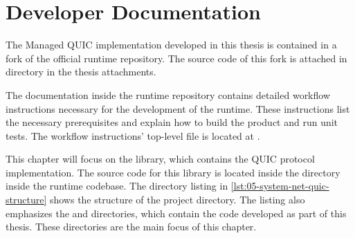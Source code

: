 \chapter{Developer Documentation}

The Managed QUIC implementation developed in this thesis is contained in a fork of the official
\dotnet{} runtime repository. The source code of this fork is attached in
 directory in the thesis attachments.

The documentation inside the \dotnet{} runtime repository contains detailed workflow instructions
necessary for the development of the \dotnet{} runtime. These instructions list the necessary
prerequisites and explain how to build the product and run unit tests. The workflow instructions'
top-level file is located at .

This chapter will focus on the  library, which contains the QUIC protocol
implementation. The source code for this library is located inside the
 directory inside the \dotnet{} runtime codebase. The
directory listing in \autoref{lst:05-system-net-quic-structure} shows the structure of the
 project directory. The listing also emphasizes the  and
 directories, which contain the code developed as part of this thesis. These
directories are the main focus of this chapter.

\newcommand{\mydtcomment}[1]{\DTcomment{#1}}
\DTsetlength{0.2em}{0.6em}{0.2em}{0.4pt}{1.6pt}
\renewcommand{\DTstylecomment}[1]{{\footnotesize\rmfamily #1}}
\renewcommand{\DTstyle}[1]{{\footnotesize\texttt{#1}}}
\newcommand{\dtemph}[1]{\textcolor{dtemphcolor}{\emph{#1}}}

